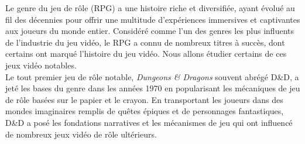 Le genre du jeu de rôle (RPG) a une histoire riche et diversifiée, ayant évolué au fil des décennies pour offrir une multitude d'expériences immersives et captivantes aux joueurs du monde entier. 
Considéré comme l'un des genres les plus influents de l'industrie du jeu vidéo, le RPG a connu de nombreux titres à succès, dont certains ont marqué l'histoire du jeu vidéo.
Nous allons étudier certains de ces jeux vidéo notables.
\\

Le tout premier jeu de rôle notable, \textit{Dungeons \& Dragons} souvent abrégé D\&D, a jeté les bases du genre dans les années 1970 en popularisant les mécaniques de jeu de rôle basées sur le papier et le crayon.
En transportant les joueurs dans des mondes imaginaires remplis de quêtes épiques et de personnages fantastiques, D\&D a posé les fondations narratives et les mécanismes de jeu qui ont influencé de nombreux jeux vidéo de rôle ultérieurs.
\\




    

